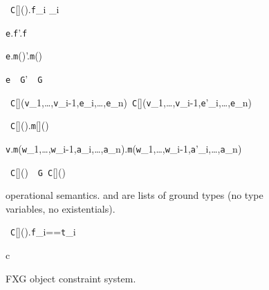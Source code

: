 \begin{figure*}
\vspace{-\bigskipamount}
\begin{minipage}{.33\textwidth}
\quad{}
	{\new~{\tt C}[]().{\tt f}_i _i}

	{{\tt e}.{\tt f}'.{\tt f}}

	{{\tt e}.{\tt m}()'.{\tt m}()}

	{{\tt e}~\as~{\tt G}'~\as~{\tt G}}
\end{minipage}%
\begin{minipage}{.67\textwidth}
\quad{}
	{\new~{\tt C}[]({\tt v}_1,\ldots,{\tt v}_{i-1},{\tt e}_i,\ldots,{\tt e}_n)\derives\new~{\tt C}[]({\tt v}_1,\ldots,{\tt v}_{i-1},{\tt e}'_i,\ldots,{\tt e}_n)}

	{\new~{\tt C}[]().{\tt m}[]()\theta}

	{{\tt v}.{\tt m}({\tt w}_1,\ldots,{\tt w}_{i-1},{\tt a}_i,\ldots,{\tt a}_n).{\tt m}({\tt w}_1,\ldots,{\tt w}_{i-1},{\tt a}'_i,\ldots,{\tt a}_n)}

	{\new~{\tt C}[]()~\as~{\tt G}\derives\new~{\tt C}[]()}
\end{minipage}
\caption{\FXG operational semantics.  and  are lists of ground types (no type variables, no existentials).}
\label{fig:sos}
\end{figure*}


\begin{figure*}
\vspace{-\bigskipamount}
\begin{minipage}{.5\textwidth}
\quad{}
  {\vdashX \new~{\tt C}[]().{\tt f}_i=={\tt t}_i}
\end{minipage}%
\begin{minipage}{.5\textwidth}
\quad{}
  {\Gamma\vdash c}
\end{minipage}%
\caption{{\sf FXG} object constraint system.}
\label{fig:object}
\end{figure*}


